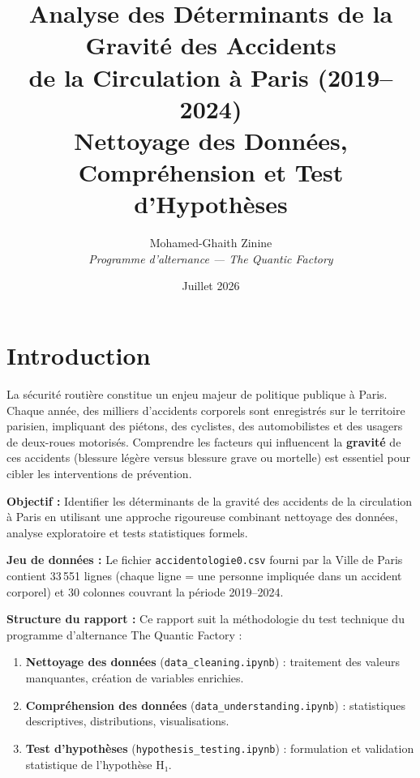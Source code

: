 \documentclass[12pt,a4paper]{article}
\title{%
  \textbf{Analyse des Déterminants de la Gravité des Accidents\\
  de la Circulation à Paris (2019--2024)}\\[0.5em]
  \large Nettoyage des Données, Compréhension et Test d'Hypothèses
}
\author{%
  Mohamed-Ghaith Zinine\\
  \textit{Programme d'alternance --- The Quantic Factory}
}
\date{Juillet 2026}
\begin{document}
\maketitle
\thispagestyle{empty}

\newpage
\tableofcontents
\newpage

\section{Introduction}

La sécurité routière constitue un enjeu majeur de politique publique à Paris.
Chaque année, des milliers d'accidents corporels sont enregistrés sur le
territoire parisien, impliquant des piétons, des cyclistes, des automobilistes
et des usagers de deux-roues motorisés. Comprendre les facteurs qui influencent
la \textbf{gravité} de ces accidents (blessure légère versus blessure grave
ou mortelle) est essentiel pour cibler les interventions de prévention.

\textbf{Objectif :} Identifier les déterminants de la gravité des accidents
de la circulation à Paris en utilisant une approche rigoureuse combinant
nettoyage des données, analyse exploratoire et tests statistiques formels.

\textbf{Jeu de données :} Le fichier \texttt{accidentologie0.csv} fourni
par la Ville de Paris contient 33\,551 lignes (chaque ligne = une personne
impliquée dans un accident corporel) et 30 colonnes couvrant la période
2019--2024.

\textbf{Structure du rapport :} Ce rapport suit la méthodologie du test
technique du programme d'alternance The Quantic Factory :
\begin{enumerate}[label=\arabic*-]
  \item \textbf{Nettoyage des données} (\texttt{data\_cleaning.ipynb}) :
        traitement des valeurs manquantes, création de variables enrichies.
  \item \textbf{Compréhension des données} (\texttt{data\_understanding.ipynb}) :
        statistiques descriptives, distributions, visualisations.
  \item \textbf{Test d'hypothèses} (\texttt{hypothesis\_testing.ipynb}) :
        formulation et validation statistique de l'hypothèse H₁.
\end{enumerate}
\end{document}

